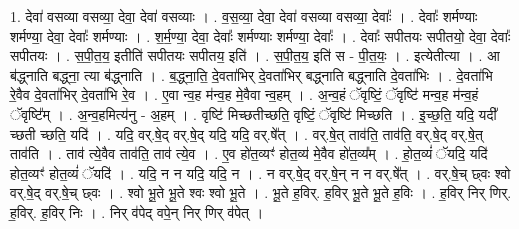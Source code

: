 \documentclass[17pt]{extarticle}
\begin{document}
1. देवा॑ वसव्या वसव्या॒ देवा॒ देवा॑ वसव्याः । . व॒स॒व्या॒ देवा॒ देवा॑ वसव्या वसव्या॒ देवाः᳚ । . देवाः᳚ शर्मण्याः शर्मण्या॒ देवा॒ देवाः᳚ शर्मण्याः । . श॒र्म॒ण्या॒ देवा॒ देवाः᳚ शर्मण्याः शर्मण्या॒ देवाः᳚ । . देवाः᳚ सपीतयः सपीतयो॒ देवा॒ देवाः᳚ सपीतयः । . स॒पी॒त॒य॒ इतीति॑ सपीतयः सपीतय॒ इति॑ । . स॒पी॒त॒य॒ इति॑ स - पी॒त॒यः॒ । . इत्येतीत्या । . आ ब॑द्ध्नाति बद्ध्ना॒ त्या ब॑द्ध्नाति । . ब॒द्ध्ना॒ति॒ दे॒वता॑भिर् दे॒वता॑भिर् बद्ध्नाति बद्ध्नाति दे॒वता॑भिः । . दे॒वता॑भि रे॒वैव दे॒वता॑भिर् दे॒वता॑भि रे॒व । . ए॒वा न्व॒ह म॑न्व॒ह मे॒वैवा न्व॒हम् । . अ॒न्व॒हं ॅवृष्टिं॒ ॅवृष्टि॑ मन्व॒ह म॑न्व॒हं ॅवृष्टि᳚म् । . अ॒न्व॒हमित्य॑नु - अ॒हम् । . वृष्टि॑ मिच्छतीच्छति॒ वृष्टिं॒ ॅवृष्टि॑ मिच्छति । . इ॒च्छ॒ति॒ यदि॒ यदी᳚ च्छती च्छति॒ यदि॑ । . यदि॒ वर्.षे॒द् वर्.षे॒द् यदि॒ यदि॒ वर्.षे᳚त् । . वर्.षे॒त् ताव॑ति॒ ताव॑ति॒ वर्.षे॒द् वर्.षे॒त् ताव॑ति । . ताव॑ त्ये॒वैव ताव॑ति॒ ताव॑ त्ये॒व । . ए॒व हो॑त॒व्यꣳ॑ होत॒व्य॑ मे॒वैव हो॑त॒व्य᳚म् । . हो॒त॒व्यं॑ ॅयदि॒ यदि॑ होत॒व्यꣳ॑ होत॒व्यं॑ ॅयदि॑ । . यदि॒ न न यदि॒ यदि॒ न । . न वर्.षे॒द् वर्.षे॒न् न न वर्.षे᳚त् । . वर्.षे॒च् छ्वः श्वो वर्.षे॒द् वर्.षे॒च् छ्वः । . श्वो भू॒ते भू॒ते श्वः श्वो भू॒ते । . भू॒ते ह॒विर्. ह॒विर् भू॒ते भू॒ते ह॒विः । . ह॒विर् निर् णिर्. ह॒विर्. ह॒विर् निः । . निर् व॑पेद् वपे॒न् निर् णिर् व॑पेत् । \newline
\end{document}
